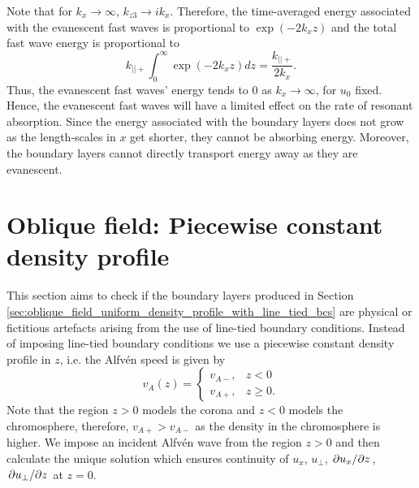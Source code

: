 Note that for $k_x\rightarrow\infty$, $k_{z3}\rightarrow ik_x$. Therefore, the time-averaged energy associated with the evanescent fast waves is proportional to $\exp(-2k_x z)$ and the total fast wave
energy is proportional to
\begin{equation}
    k_{||+}\int_0^\infty \exp(-2 k_x z) dz = \frac{k_{||+}}{2k_x}.
\end{equation}
Thus, the evanescent fast waves' energy tends to 0 as $k_x\rightarrow \infty$, for $u_0$ fixed. Hence, the evanescent fast waves will have a limited effect on the rate of resonant absorption. Since the energy associated with the boundary layers does not grow as the length-scales in $x$ get shorter, they cannot be absorbing energy. Moreover, the boundary layers cannot directly transport energy away as they are evanescent.

\section{Oblique field: Piecewise constant density profile}
\label{sec:oblique_field_piecewise_constant_density_profile}

This section aims to check if the boundary layers produced in Section \ref{sec:oblique_field_uniform_density_profile_with_line_tied_bcs} are physical or fictitious artefacts arising from the use of line-tied boundary conditions. Instead of imposing line-tied boundary conditions we use a piecewise constant density profile in $z$, i.e. the Alfv\'en speed is given by
\begin{equation}
    v_A(z) = \begin{cases}
    v_{A-}, & z < 0 \\
    v_{A+}, & z \ge 0.
    \end{cases}
\end{equation}
Note that the region $z>0$ models the corona and $z<0$ models the chromosphere, therefore, $v_{A+} > v_{A-}$ as the density in the chromosphere is higher. We impose an incident Alfv\'en wave from the region $z>0$ and then calculate the unique solution which ensures continuity of $u_x$, $u_\perp$, $\pdv*{u_x}{z}$, $\pdv*{u_\perp}{z}$ at $z=0$.


